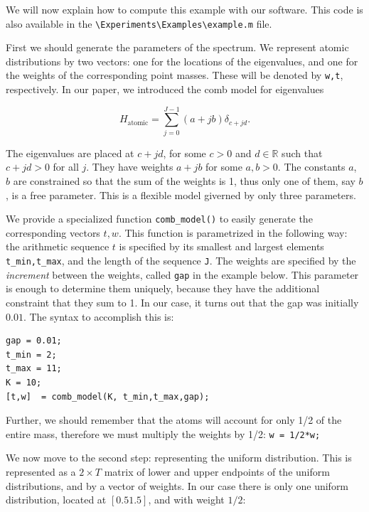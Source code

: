 \documentclass[english,11pt]{article} %
\begin{document}
We will now explain how to compute this example with our software. This code is also available in the \verb+\Experiments\Examples\example.m+ file.  

First we should generate the parameters of the spectrum. We represent atomic distributions by two vectors: one for the locations of the eigenvalues, and one for the weights of the corresponding point masses. These will be denoted by \verb+w,t+, respectively. In our paper, we introduced the comb model for eigenvalues 


\begin{equation*}
\label{Comb_model}
H_{\mathrm{atomic}} = \sum_{j=0}^{J-1} (a + jb) \delta_{c+jd}.
\end{equation*}

The eigenvalues are placed at $c+jd$, for some $c>0$ and $d \in \mathbb{R}$ such that $c+jd>0$ for all $j$. They have weights $a + jb$ for some $a,b>0$. The constants $a$, $b$ are constrained so that the sum of the weights is 1, thus only one of them, say $b$, is a free parameter. This is a flexible model giverned by only three parameters. 

We provide a specialized function \verb+comb_model()+ to easily generate the corresponding vectors $t,w$. This function is parametrized in the following way: the arithmetic sequence $t$ is specified by its smallest and largest elements \verb+t_min,t_max+, and the length of the sequence \verb+J+. The weights are specified by the \emph{increment} between the weights, called \verb+gap+ in the example below. This parameter is enough to determine them uniquely, because they have the additional constraint that they sum to 1. In our case, it turns out that the gap was initially $0.01$. The syntax to accomplish this is:

\begin{verbatim}
gap = 0.01;
t_min = 2;
t_max = 11;
K = 10;
[t,w]  = comb_model(K, t_min,t_max,gap);
\end{verbatim}

 Further, we should remember that the atoms will account for only 1/2 of the entire mass, therefore we must multiply the weights by 1/2: \verb+w = 1/2*w;+
 
We now move to the second step: representing the uniform distribution. This is represented as a $2 \times T$ matrix of lower and upper endpoints of the uniform distributions, and by a vector of weights.  In our case there is only one uniform distribution, located at $[0.5 1.5]$, and with weight $1/2$: 
\end{document}
